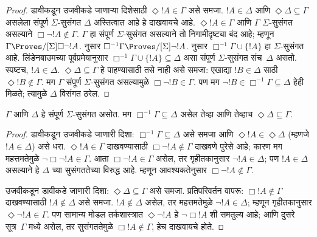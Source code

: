 \documentclass[../../../include/open-logic-section]{subfiles}
\begin{document}
{\begin{proof}
  डावीकडून उजवीकडे जाणाऱ्या दिशेसाठी
  $\Diamond !A \in \Gamma$ असे समजा.
  $!A \in \Delta$ आणि
  $\Diamond\Delta \subseteq \Gamma$
  असलेला संपूर्ण $\Sigma$-सुसंगत
  $\Delta$ अस्तित्वात आहे हे दाखवायचे
  आहे. $\Diamond !A \in \Gamma$
  आणि $\Gamma$ $\Sigma$-सुसंगत असल्याने
  $\Box\lnot !A \notin \Gamma$.
  $\Gamma$ हा संपूर्ण $\Sigma$-सुसंगत
  असल्याने तो निगामीदृष्ट्या बंद आहे;
  म्हणून $\Gamma \Proves/[\Sigma]
  \Box\lnot !A$.  नुसार
  $\Box^{-1}\Gamma \Proves/[\Sigma] \lnot !A$.
  नुसार $\Box^{-1}\Gamma \cup \{ !A \}$
  हा $\Sigma$-सुसंगत आहे. लिंडेनबाउमच्या
  पूर्वप्रमेयानुसार $\Box^{-1}\Gamma \cup
  \{ !A \} \subseteq \Delta$ असा
  संपूर्ण $\Sigma$-सुसंगत संच~$\Delta$
  असतो. स्पष्टच, $!A \in \Delta$.
  $\Diamond\Delta \subseteq \Gamma$
  हे पाहण्यासाठी तसे नाही असे समजा:
  एखाद्या $!B \in \Delta$ साठी
  $\Diamond !B \notin \Gamma$. मग
  $\Gamma$ संपूर्ण $\Sigma$-सुसंगत
  असल्यामुळे $\Box\lnot !B \in \Gamma$.
  पण मग $\lnot !B \in \Box^{-1}\Gamma
  \subseteq \Delta$ हेही मिळते; त्यामुळे
  $\Delta$ विसंगत ठरेल.
\end{proof}
}

\begin{lem}
  $\Gamma$ आणि $\Delta$ हे संपूर्ण
  $\Sigma$-सुसंगत असोत. मग
  $\Box^{-1}\Gamma \subseteq \Delta$
  असेल तेव्हा आणि तेव्हाच
  $\Diamond\Delta \subseteq \Gamma$.
\end{lem}

\begin{proof}
  डावीकडून उजवीकडे जाणारी दिशा: $\Box^{-1}\Gamma
  \subseteq \Delta$ असे समजा आणि
  $\Diamond!A \in \Diamond\Delta$
  (म्हणजे $!A \in \Delta$) असे धरा.
  $\Diamond!A \in \Gamma$ दाखवण्यासाठी
  $\Box\lnot!A \notin \Gamma$ दाखवणे
  पुरेसे आहे; कारण मग महत्तमतेमुळे
  $\lnot\Box\lnot !A \in \Gamma$.
  आता $\Box\lnot!A \in \Gamma$
  असेल, तर गृहीतकानुसार
  $\lnot!A \in \Delta$; पण
  $!A \in \Delta$ असल्याने हे
  $\Delta$ च्या सुसंगततेच्या
  विरुद्ध आहे. म्हणून आवश्यकतेनुसार
  $\Box\lnot!A \notin \Gamma$.

  उजवीकडून डावीकडे जाणारी दिशा: $\Diamond\Delta
  \subseteq \Gamma$ असे समजा.
  प्रतिपरिवर्तन वापरू: $\Box!A
  \notin \Gamma$ दाखवण्यासाठी
  $!A \notin \Delta$ असे समजा.
  $!A \notin \Delta$ असेल,
  तर महत्तमतेमुळे
  $\lnot!A \in \Delta$;
  म्हणून गृहीतकानुसार
  $\Diamond\lnot!A \in \Gamma$.
  पण सामान्य मोडल तर्कशास्त्रात
  $\Diamond\lnot!A$ हे
  $\lnot\Box !A$ शी समतुल्य आहे;
  आणि दुसरे सूत्र~$\Gamma$ मध्ये
  असेल, तर सुसंगततेमुळे
  $\Box!A \notin\Gamma$,
  हेच दाखवायचे होते.
\end{proof}
\end{document}
